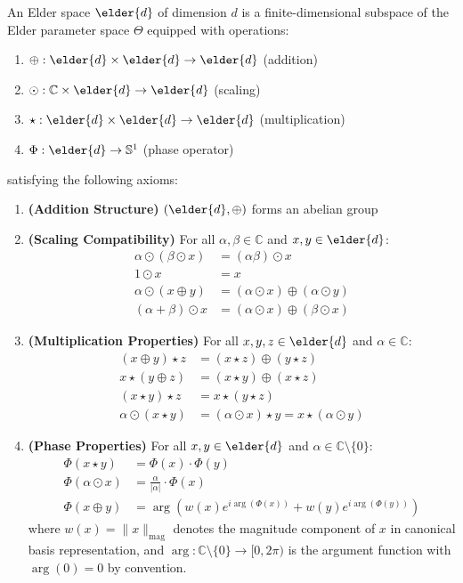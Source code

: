 \begin{definition}
An Elder space $\elder{d}$ of dimension $d$ is a finite-dimensional subspace of the Elder parameter space $\Theta$ equipped with operations:
\begin{enumerate}
    \item $\oplus: \elder{d} \times \elder{d} \rightarrow \elder{d}$ (addition)
    \item $\odot: \mathbb{C} \times \elder{d} \rightarrow \elder{d}$ (scaling)
    \item $\star: \elder{d} \times \elder{d} \rightarrow \elder{d}$ (multiplication)
    \item $\Phi: \elder{d} \rightarrow \mathbb{S}^1$ (phase operator)
\end{enumerate}
satisfying the following axioms:
\begin{enumerate}[label=\textbf{A\arabic*}]
    \item \textbf{(Addition Structure)} $(\elder{d}, \oplus)$ forms an abelian group
    \item \textbf{(Scaling Compatibility)} For all $\alpha, \beta \in \mathbb{C}$ and $x, y \in \elder{d}$:
    \begin{align}
        \alpha \odot (\beta \odot x) &= (\alpha\beta) \odot x\\
        1 \odot x &= x\\
        \alpha \odot (x \oplus y) &= (\alpha \odot x) \oplus (\alpha \odot y)\\
        (\alpha + \beta) \odot x &= (\alpha \odot x) \oplus (\beta \odot x)
    \end{align}
    
    \item \textbf{(Multiplication Properties)} For all $x, y, z \in \elder{d}$ and $\alpha \in \mathbb{C}$:
    \begin{align}
        (x \oplus y) \star z &= (x \star z) \oplus (y \star z)\\
        x \star (y \oplus z) &= (x \star y) \oplus (x \star z)\\
        (x \star y) \star z &= x \star (y \star z)\\
        \alpha \odot (x \star y) &= (\alpha \odot x) \star y = x \star (\alpha \odot y)
    \end{align}
    
    \item \textbf{(Phase Properties)} For all $x, y \in \elder{d}$ and $\alpha \in \mathbb{C} \setminus \{0\}$:
    \begin{align}
        \Phi(x \star y) &= \Phi(x) \cdot \Phi(y)\\
        \Phi(\alpha \odot x) &= \frac{\alpha}{|\alpha|} \cdot \Phi(x)\\
        \Phi(x \oplus y) &= \arg\left(w(x)e^{i\arg(\Phi(x))} + w(y)e^{i\arg(\Phi(y))}\right)
    \end{align}
    where $w(x) = \|x\|_{\text{mag}}$ denotes the magnitude component of $x$ in canonical basis representation, and $\arg: \mathbb{C} \setminus \{0\} \rightarrow [0, 2\pi)$ is the argument function with $\arg(0) = 0$ by convention.
\end{enumerate}
\end{definition}

